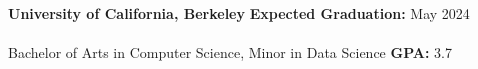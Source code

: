 \documentclass[11pt]{article}
\begin{document}
    

        \begin{adjustwidth}{1em}{1em}

            \textbf{University of California, Berkeley} 
            \hfill 
            \textbf{Expected Graduation:} May 2024 \\\\
            Bachelor of Arts in Computer Science, Minor in Data Science \hfill  \textbf{GPA:} 3.7

            \vspace{2.5mm}

        \end{adjustwidth}

    
\end{document}
